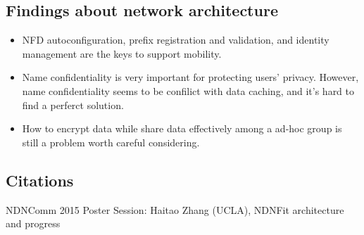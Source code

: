 \documentclass{article}
\begin{document}
\subsection{Findings about network architecture }
\begin{itemize}
	\item NFD autoconfiguration, prefix registration and validation, and identity management are the keys to support mobility.
	\item Name confidentiality is very important for protecting users' privacy. However, name confidentiality seems to be confilict with data caching, and it's hard to find a perferct solution.
	\item How to encrypt data while share data effectively among a ad-hoc group is still a problem worth careful considering.
\end{itemize}

\subsection{Citations}
NDNComm 2015 Poster Session: Haitao Zhang (UCLA), NDNFit architecture and progress



\end{document}
